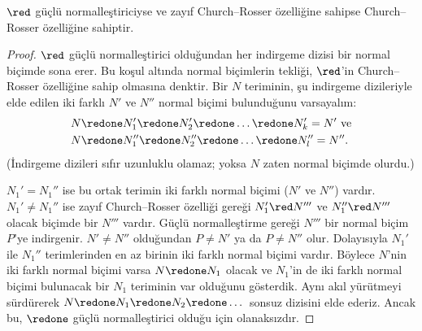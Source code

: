 \documentclass[../../../include/open-logic-section]{subfiles}
\begin{document}
\begin{lem}
$\red$ güçlü normalleştiriciyse ve zayıf Church--Rosser özelliğine sahipse
Church--Rosser özelliğine sahiptir.
\end{lem}

\begin{proof}
  $\red$ güçlü normalleştirici olduğundan her indirgeme dizisi bir normal
  biçimde sona erer. Bu koşul altında normal biçimlerin tekliği,
  $\red$'in Church--Rosser özelliğine sahip olmasına denktir. Bir $N$
  teriminin, şu indirgeme
  dizileriyle elde edilen iki farklı $N'$ ve $N''$ normal biçimi bulunduğunu
  varsayalım:
  \begin{align*}
  N &\redone N_1' \redone N_2' \redone \dots \redone N_k' = N'
    \text{ ve}\\
  N &\redone N_1'' \redone N_2'' \redone \dots \redone N_l'' = N''.
  \end{align*}
  (İndirgeme dizileri sıfır uzunluklu olamaz; yoksa $N$ zaten normal biçimde
  olurdu.)

  $N_1'=N_1''$ ise bu ortak terimin iki farklı normal biçimi ($N'$ ve
  $N''$) vardır. $N_1'\neq N_1''$ ise zayıf Church--Rosser özelliği gereği
  $N_1'\red N'''$ ve $N_1''\red N'''$ olacak biçimde bir $N'''$ vardır.
  Güçlü normalleştirme gereği $N'''$ bir normal biçim~$P$'ye indirgenir.
  $N'\neq N''$ olduğundan $P\neq N'$ ya da $P\neq N''$ olur. Dolayısıyla
  $N_1'$ ile $N_1''$ terimlerinden en az birinin iki farklı normal biçimi
  vardır. Böylece $N$'nin iki farklı normal biçimi varsa
  $N\redone N_1$ olacak ve $N_1$'in de iki farklı normal biçimi bulunacak
  bir $N_1$ teriminin var olduğunu gösterdik. Aynı akıl yürütmeyi sürdürerek
  $N\redone N_1\redone N_2\redone\dots$ sonsuz dizisini elde ederiz. Ancak
  bu, $\redone$ güçlü normalleştirici olduğu için olanaksızdır.
\end{proof}
\end{document}
